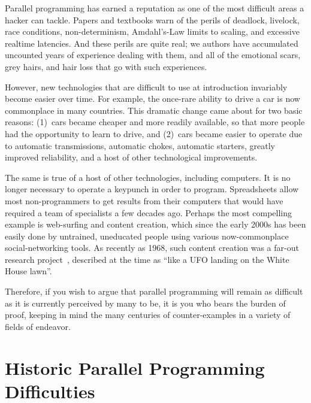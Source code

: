 

Parallel programming has earned a reputation as one of the most
difficult areas a hacker can tackle.
Papers and textbooks warn of the perils of deadlock, livelock,
race conditions, non-determinism, Amdahl's-Law limits to scaling,
and excessive realtime latencies.
And these perils are quite real; we authors have accumulated uncounted
years of experience dealing with them, and all of the emotional scars,
grey hairs, and hair loss that go with such experiences.

However, new technologies that are difficult to use at introduction
invariably become easier over time.
For example, the once-rare ability to drive a car is now
commonplace in many countries.
This dramatic change came about for two basic reasons: (1)~cars became
cheaper and more readily available, so that more people had the
opportunity to learn to drive, and (2)~cars became easier to operate
due to automatic transmissions, automatic chokes, automatic starters,
greatly improved reliability,
and a host of other technological improvements.

The same is true of a host of other technologies, including computers.
It is no longer necessary to operate a keypunch in order to program.
Spreadsheets allow most non-programmers to get results from their computers
that would have required a team of specialists a few decades ago.
Perhaps the most compelling example is web-surfing and content creation,
which since the early 2000s has been easily done by
untrained, uneducated people using various now-commonplace
social-networking tools.
As recently as 1968, such content creation was a far-out research
project~\cite{DouglasEngelbart1968}, described at
the time as
``like a UFO landing on the White House lawn''\cite{ScottGriffen2000}.

Therefore, if you wish to argue that parallel programming will remain
as difficult as it is currently perceived by many to be, it is you
who bears the burden of proof, keeping in mind the many centuries of
counter-examples in a variety of fields of endeavor.

\section{Historic Parallel Programming Difficulties}
\label{sec:intro:Historic Parallel Programming Difficulties}

